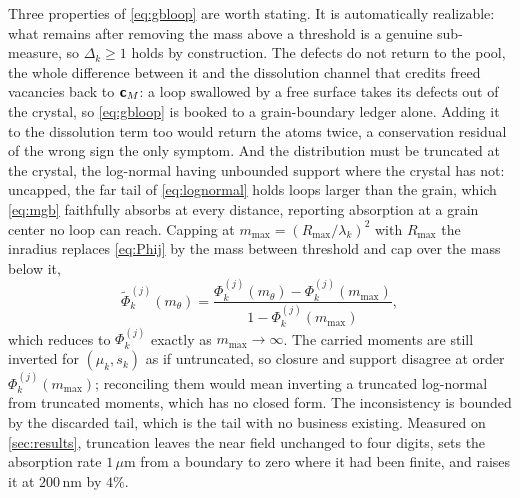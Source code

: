Three properties of \cref{eq:gbloop} are worth stating. It is automatically
realizable: what remains after removing the mass above a threshold is a genuine
sub-measure, so $\Delta_k\ge1$ holds by construction. The defects do not return to the pool, the whole difference
between it and the dissolution channel that credits freed vacancies back to
$\bm{\mathsf{c}}_M$: a loop swallowed by a free surface takes its defects out of the
crystal, so \cref{eq:gbloop} is booked to a grain-boundary ledger alone. Adding
it to the dissolution term too would return the atoms twice, a conservation
residual of the wrong sign the only symptom. And the
distribution must be truncated at the crystal, the log-normal having unbounded
support where the crystal has not: uncapped, the far tail of
\cref{eq:lognormal} holds loops larger than the grain, which \cref{eq:mgb}
faithfully absorbs at every distance, reporting absorption at a grain center no
loop can reach. Capping at $m_{\max}=(R_{\max}/\lambda_k)^{2}$ with $R_{\max}$
the inradius replaces \cref{eq:Phij} by the mass between threshold and cap over
the mass below it,
\begin{equation}
  \widetilde\Phi^{(j)}_k(m_\theta)
  =\frac{\Phi^{(j)}_k(m_\theta)-\Phi^{(j)}_k(m_{\max})}
         {1-\Phi^{(j)}_k(m_{\max})},
  \label{eq:trunc}
\end{equation}
which reduces to $\Phi^{(j)}_k$ exactly as $m_{\max}\to\infty$. The carried
moments are still inverted for $(\mu_k,s_k)$ as if untruncated, so closure and
support disagree at order $\Phi^{(j)}_k(m_{\max})$; reconciling them would mean
inverting a truncated log-normal from truncated moments, which has no closed
form. The inconsistency is bounded by the discarded tail, which is the tail with
no business existing. Measured on \cref{sec:results}, truncation leaves the near field
unchanged to four digits, sets the absorption rate $1\,\mu$m from a boundary to
zero where it had been finite, and raises it at $200\,$nm by $4\%$.

